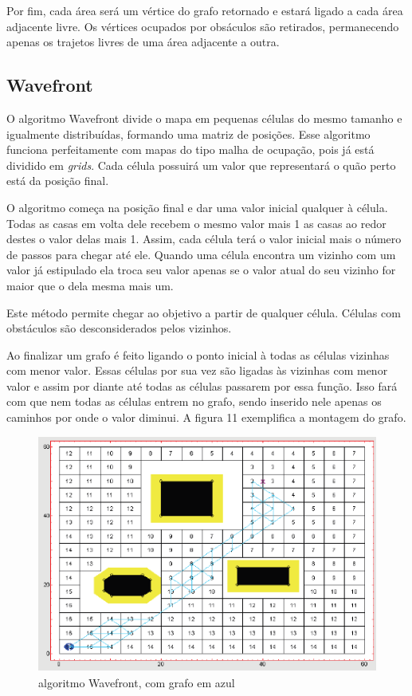 Por fim, cada área será um vértice do grafo retornado e estará ligado a cada área adjacente livre.  Os vértices ocupados por obsáculos são retirados, permanecendo apenas os trajetos livres de uma área adjacente a outra.

\subsection{Wavefront}

O algoritmo Wavefront divide o mapa em pequenas células do mesmo tamanho e igualmente distribuídas, formando uma matriz de posições. Esse algoritmo funciona perfeitamente com mapas do tipo malha de ocupação, pois já está dividido em \textit{grids}. Cada célula possuirá um valor que representará o quão perto está da posição final.

O algoritmo começa na posição final e dar uma valor inicial qualquer à célula. Todas as casas em volta dele recebem o mesmo valor mais 1 as casas ao redor destes o valor delas mais 1. Assim, cada célula terá o valor inicial mais o número de passos para chegar até ele. Quando uma célula encontra um vizinho com um valor já estipulado ela troca seu valor apenas se o valor atual do seu vizinho for maior que o dela mesma mais um.

Este método permite chegar ao objetivo a partir de qualquer célula. Células com obstáculos são desconsiderados pelos vizinhos. 

Ao finalizar um grafo é feito ligando o ponto inicial à todas as células vizinhas com menor valor. Essas células por sua vez são ligadas às vizinhas com menor valor e assim por diante até todas as células passarem por essa função. Isso fará com que nem todas as células entrem no grafo, sendo inserido nele apenas os caminhos por onde o valor diminui. A figura 11 exemplifica a montagem do grafo.

\begin{figure}[h]
	\centering
	\label{fig11}
		\includegraphics[keepaspectratio=true,scale=0.5]{figuras/10wavefront.png}
	\caption{algoritmo Wavefront, com grafo em azul \cite{MRIT_SITE}}
\end{figure}

